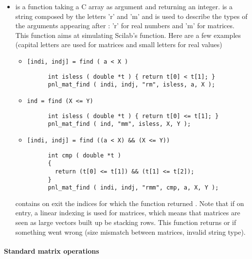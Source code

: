 \begin{itemize}
\item {}
  \sshortdescribe {} is a function taking a C array as argument and
  returning an integer.  is a string composed by the letters 'r' and
  'm' and is used to describe the types of the arguments appearing after 
  : 'r' for real numbers and 'm' for matrices.
  This function aims at simulating Scilab's 
  function. Here are a few examples (capital letters are used for matrices and
  small letters for real values)
  \begin{itemize}
    \item \verb![indi, indj] = find ( a < X )!
      \begin{verbatim}
      int isless ( double *t ) { return t[0] < t[1]; }
      pnl_mat_find ( indi, indj, "rm", isless, a, X );
      \end{verbatim}
    \item \verb!ind = find (X <= Y)!
      \begin{verbatim}
      int isless ( double *t ) { return t[0] <= t[1]; }
      pnl_mat_find ( ind, "mm", isless, X, Y );
      \end{verbatim}
    \item \verb![indi, indj] = find ((a < X) && (X <= Y))!
      \begin{verbatim}
      int cmp ( double *t ) 
      { 
        return (t[0] <= t[1]) && (t[1] <= t[2]); 
      }
      pnl_mat_find ( indi, indj, "rmm", cmp, a, X, Y );
      \end{verbatim}
  \end{itemize}
   contains on exit the indices  for which the function 
  returned . Note that if  on entry, a linear indexing
  is used for matrices, which means that matrices are seen as large vectors
  built up be stacking rows. This function returns  or  if
  something went wrong (size mismatch between matrices, invalid string type).
\end{itemize}


\paragraph{Standard matrix operations}

